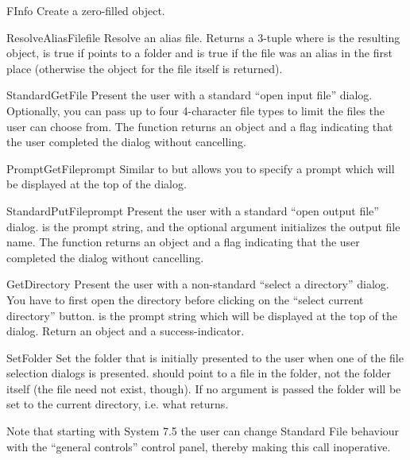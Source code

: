\begin{funcdesc}{FInfo}{}
Create a zero-filled  object.
\end{funcdesc}

\begin{funcdesc}{ResolveAliasFile}{file}
Resolve an alias file. Returns a 3-tuple  where  is the resulting
 object,  is true if  points
to a folder and  is true if the file was an alias in the
first place (otherwise the  object for the file itself
is returned).
\end{funcdesc}

\begin{funcdesc}{StandardGetFile}{}
Present the user with a standard ``open input file''
dialog. Optionally, you can pass up to four 4-character file types to limit
the files the user can choose from. The function returns an 
object and a flag indicating that the user completed the dialog
without cancelling.
\end{funcdesc}

\begin{funcdesc}{PromptGetFile}{prompt}
Similar to  but allows you to specify a
prompt which will be displayed at the top of the dialog.
\end{funcdesc}

\begin{funcdesc}{StandardPutFile}{prompt}
Present the user with a standard ``open output file''
dialog.  is the prompt string, and the optional
 argument initializes the output file name. The function
returns an  object and a flag indicating that the user
completed the dialog without cancelling.
\end{funcdesc}

\begin{funcdesc}{GetDirectory}{}
Present the user with a non-standard ``select a directory'' dialog.  You
have to first open the directory before clicking on the ``select current
directory'' button.  is the prompt string which will be
displayed at the top of the dialog. Return an  object and
a success-indicator.
\end{funcdesc}

\begin{funcdesc}{SetFolder}{}
Set the folder that is initially presented to the user when one of
the file selection dialogs is presented.  should point to
a file in the folder, not the folder itself (the file need not exist,
though). If no argument is passed the folder will be set to the
current directory, i.e. what  returns.

Note that starting with System 7.5 the user can change Standard File
behaviour with the ``general controls'' control panel, thereby making
this call inoperative.
\end{funcdesc}

